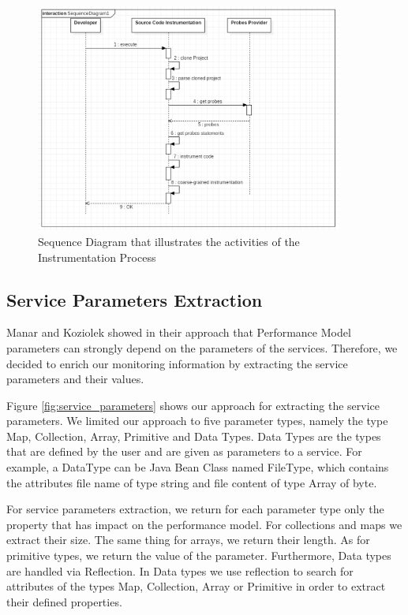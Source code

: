 \begin{figure}[h]
\centering
\includegraphics[width=0.9\textwidth]{figures/instrumentation_process}
\caption{Sequence Diagram that illustrates the activities of the Instrumentation Process}
\label{fig:instrumentation_process}
\end{figure}

\subsection{Service Parameters Extraction}
\label{sec:Service Parameters Extraction}
Manar and Koziolek showed in their approach \cite{mazkatli2018continuous} that Performance Model parameters can strongly depend on the parameters of the services. Therefore, we decided to enrich our monitoring information by extracting the service parameters and their values. 

Figure \ref{fig:service_parameters} shows our approach for extracting the service parameters. We limited our approach to five parameter types, namely the type Map, Collection, Array, Primitive and Data Types. Data Types are the types that are defined by the user and are given as parameters to a service. For example, a DataType can be Java Bean Class named FileType, which contains the attributes file name of type string and file content of type Array of byte.

For service parameters extraction, we return for each parameter type only the property that has impact on the performance model. For collections and maps we extract their size. The same thing for arrays, we return their length. As for primitive types, we return the value of the parameter. Furthermore, Data types are handled via Reflection. In Data types we use reflection to search for attributes of the types Map, Collection, Array or Primitive in order to extract their defined properties. 


